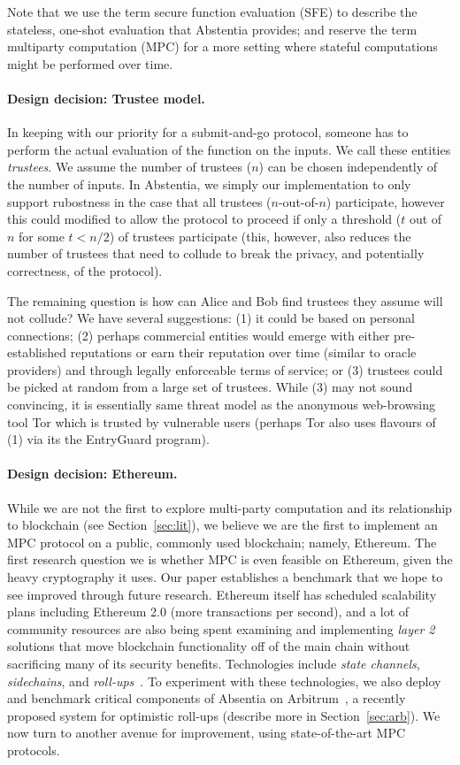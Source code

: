 Note that we use the term secure function evaluation (SFE) to describe the stateless, one-shot evaluation that Abstentia provides; and reserve the term multiparty computation (MPC) for a more setting where stateful computations might be performed over time.

\paragraph{Design decision: Trustee model.} In keeping with our priority for a submit-and-go protocol, someone has to perform the actual evaluation of the function on the inputs. We call these entities \emph{trustees}. We assume the number of trustees ($n$) can be chosen independently of the number of inputs. In Abstentia, we simply our implementation to only support rubostness in the case that all trustees ($n$-out-of-$n$) participate, however this could modified to allow the protocol to proceed if only a threshold ($t$ out of $n$ for some $t<n/2$) of trustees participate (this, however, also reduces the number of trustees that need to collude to break the privacy, and potentially correctness, of the protocol).  

The remaining question is how can Alice and Bob find trustees they assume will not collude? We have several suggestions: (1) it could be based on personal connections; (2) perhaps commercial entities would emerge with either pre-established reputations or earn their reputation over time (similar to oracle providers) and through legally enforceable terms of service; or (3) trustees could be picked at random from a large set of trustees. While (3) may not sound convincing, it is essentially same threat model as the anonymous web-browsing tool Tor which is trusted by vulnerable users (perhaps Tor also uses flavours of (1) via its the EntryGuard program). 

\paragraph{Design decision: Ethereum.} While we are not the first to explore multi-party computation and its relationship to blockchain (see Section~\ref{sec:lit}), we believe we are the first to implement an MPC protocol on a public, commonly used blockchain; namely, Ethereum. The first research question we is whether MPC is even feasible on Ethereum, given the heavy cryptography it uses. Our paper establishes a benchmark that we hope to see improved through future research. Ethereum itself has scheduled scalability plans including Ethereum 2.0 (more transactions per second), and a lot of community resources are also being spent examining and implementing \emph{layer 2} solutions that move blockchain functionality off of the main chain without sacrificing many of its security benefits. Technologies include \emph{state channels}, \emph{sidechains}, and \emph{roll-ups}~\cite{GMR+20}. To experiment with these technologies, we also deploy and benchmark critical components of Absentia on Arbitrum~\cite{KGCWF18}, a recently proposed system for optimistic roll-ups (describe more in Section~\ref{sec:arb}). We now turn to another avenue for improvement, using state-of-the-art MPC protocols.

